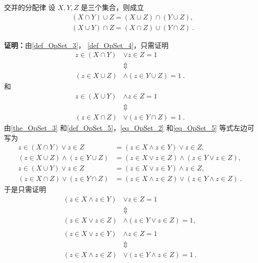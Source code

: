 \begin{theorem}{交并的分配律}
设 $X,Y,Z$ 是三个集合，则成立
\begin{equation}
\begin{aligned}
&(X\cap Y)\cup Z=(X\cup Z)\cap (Y\cup Z),\\
&(X\cup Y)\cap Z=(X\cap Z)\cup (Y\cap Z)~.
\end{aligned}
\end{equation}
\end{theorem}
\textbf{证明：}由\autoref{def_OpSet_3}， \autoref{def_OpSet_4}，只需证明
\begin{equation}\label{eq_OpSet_2}
\begin{aligned}
z\in (X\cap Y)&\lor z\in Z=1\\
&\Updownarrow\\
 (z\in X\cup Z)&\land (z\in Y\cup Z)=1~.
 \end{aligned}
 \end{equation}
 和 
 \begin{equation}\label{eq_OpSet_5}
\begin{aligned}
z\in (X\cup Y)&\land z\in Z=1\\
&\Updownarrow\\
 (z\in X\cap Z)&\lor (z\in Y\cap Z)=1~.
 \end{aligned}
 \end{equation}
由\autoref{the_OpSet_3} 和\autoref{def_OpSet_5}，\autoref{eq_OpSet_2}  和\autoref{eq_OpSet_5} 等式左边可写为
\begin{equation}
\begin{aligned}
z\in (X\cap Y)\lor z\in Z&=(z\in X\land z\in Y)\lor z\in Z,\\
(z\in X\cup Z)\land (z\in Y\cup Z)&=(z\in X\lor z\in Z
)\land (z\in Y\lor z\in Z),\\
z\in (X\cup Y)\lor z\in Z&=(z\in X\lor z\in Y)\land z\in Z,\\
(z\in X\cap Z)\lor (z\in Y\cap Z)&=(z\in X\land z\in Z)\lor (z\in Y\land z\in Z)~.
\end{aligned}
\end{equation}
于是只需证明 
\begin{equation}\label{eq_OpSet_8}
\begin{aligned}
(z\in X\land z\in Y)&\lor z\in Z=1\\
&\Updownarrow\\
(z\in X\lor z\in Z)&\land (z\in Y\lor z\in Z)=1,\\
\\
(z\in X\lor z\in Y)&\land z\in Z=1\\
&\Updownarrow\\
(z\in X\land z\in Z)&\lor (z\in Y\land z\in Z)=1~.
\end{aligned}
\end{equation}

